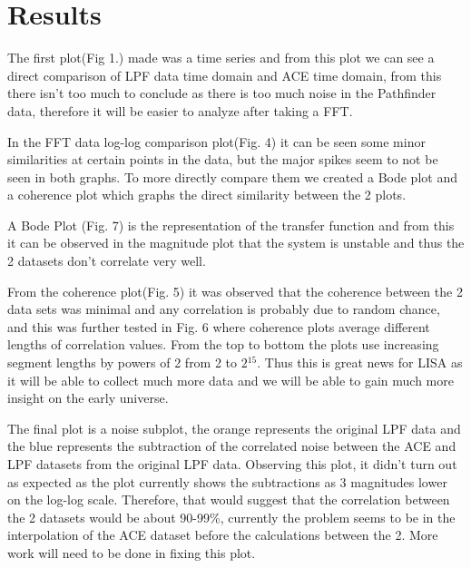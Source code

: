 \documentclass[%
 reprint,
 amsmath,amssymb,
 aps,
]{revtex4-2}
\begin{document}
\section{Results}
The first plot(Fig 1.) made was a time series and from this plot we can see a direct comparison of LPF data time domain and ACE time domain, from this there isn't too much to conclude as there is too much noise in the Pathfinder data, therefore it will be easier to analyze after taking a FFT. 

In the FFT data log-log comparison plot(Fig. 4) it can be seen some minor similarities at certain points in the data, but the major spikes seem to not be seen in both graphs. To more directly compare them we created a Bode plot and a coherence plot which graphs the direct similarity between the 2 plots. 

A Bode Plot (Fig. 7) is the representation of the transfer function and from this it can be observed in the magnitude plot that the system is unstable and thus the 2 datasets don't correlate very well. 

From the coherence plot(Fig. 5) it was observed that the coherence between the 2 data sets was minimal and any correlation is probably due to random chance, and this was further tested in Fig. 6 where coherence plots average different lengths of correlation values. From the top to bottom the plots use increasing segment lengths by powers of 2 from 2 to \(2{^15}\). Thus this is great news for LISA as it will be able to collect much more data and we will be able to gain much more insight on the early universe. 

The final plot is a noise subplot, the orange represents the original LPF data and the blue represents the subtraction of the correlated noise between the ACE and LPF datasets from the original LPF data. Observing this plot, it didn't turn out as expected as the plot currently shows the subtractions as 3 magnitudes lower on the log-log scale. Therefore, that would suggest that the correlation between the 2 datasets would be about 90-99\%, currently the problem seems to be in the interpolation of the ACE dataset before the calculations between the 2. More work will need to be done in fixing this plot. 
\end{document}
